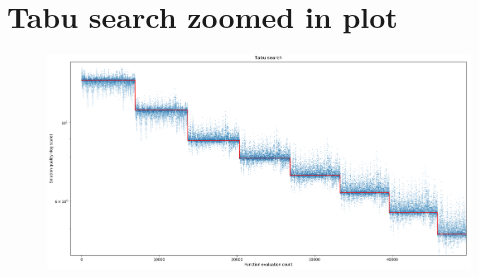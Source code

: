 \documentclass[10pt,a4paper]{article}
\begin{document}
\section*{Tabu search zoomed in plot}
\begin{figure}[H]
	\centering
	\includegraphics[width=1.4\linewidth, angle=90, origin=c]{tabu_search_zoom}
\end{figure}
\end{document}
